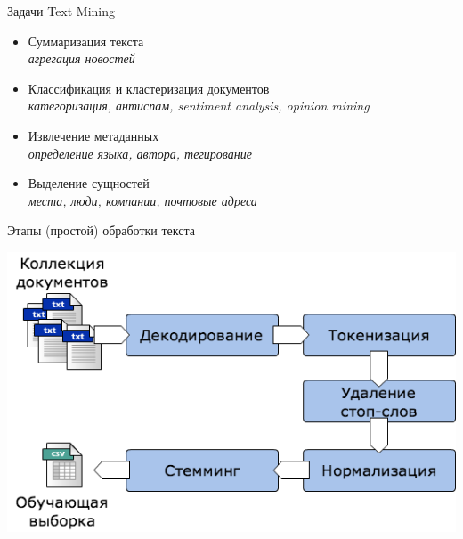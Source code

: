 \documentclass[10pt]{beamer}
\begin{document}

\begin{frame}{Задачи Text Mining}

\begin{itemize}
\item Суммаризация текста \\
{\it агрегация новостей}
\item Классификация и кластеризация документов \\
{\it категоризация, антиспам, sentiment analysis, opinion mining}
\item Извлечение метаданных \\
{\it определение языка, автора, тегирование}
\item Выделение сущностей \\
{\it места, люди, компании, почтовые адреса}
\end{itemize}

\end{frame}


\begin{frame}{Этапы (простой) обработки текста}

\begin{center}
\includegraphics[scale=0.5]{images/textm.png}
\end{center}

\end{frame}

\end{document}
